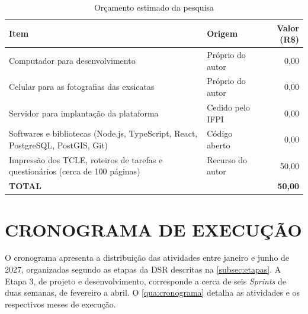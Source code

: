 \documentclass[
    12pt,        %
    openany,     %
    oneside,     %
    a4paper,     %
    english,     %
    french,      %
    spanish,     %
    brazil,      %
    article      %
]{abntex2}
\begin{document}
\begin{table}[H]
    \centering
    \caption{Orçamento estimado da pesquisa}
    \label{tab:orcamento}
    \small
    \begin{tabularx}{\textwidth}{Xlr}
        \toprule
        \textbf{Item} & \textbf{Origem} & \textbf{Valor (R\$)} \\
        \midrule
        Computador para desenvolvimento & Próprio do autor & 0,00 \\
        Celular para as fotografias das exsicatas & Próprio do autor & 0,00 \\
        Servidor para implantação da plataforma & Cedido pelo IFPI & 0,00 \\
        Softwares e bibliotecas (Node.js, TypeScript, React, PostgreSQL, PostGIS, Git) & Código aberto & 0,00 \\
        Impressão dos TCLE, roteiros de tarefas e questionários (cerca de 100 páginas) & Recurso do autor & 50,00 \\
        \midrule
        \textbf{TOTAL} & & \textbf{50,00} \\
        \bottomrule
    \end{tabularx}
\end{table}


\section{CRONOGRAMA DE EXECUÇÃO}
\label{sec:cronograma}

O cronograma apresenta a distribuição das atividades entre janeiro e junho de 2027, organizadas segundo as etapas da DSR descritas na \autoref{subsec:etapas}. A Etapa 3, de projeto e desenvolvimento, corresponde a cerca de seis \textit{Sprints} de duas semanas, de fevereiro a abril. O \autoref{qua:cronograma} detalha as atividades e os respectivos meses de execução.
\end{document}
